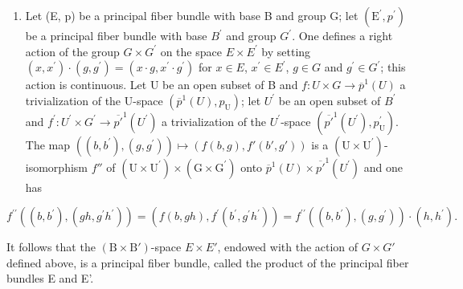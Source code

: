 \begin{enumerate}
\def\labelenumi{\arabic{enumi})}
\setcounter{enumi}{1}
\tightlist
\item
  Let (E, p) be a principal fiber bundle with base B and group G; let \((\mathrm{E}^{\prime}, p^{\prime})\) be a principal fiber bundle with base \(B^{\prime}\) and group \(G^{\prime}\). One defines a right action of the group \(G \times G^{\prime}\) on the space \(E \times E^{\prime}\) by setting \((x, x^{\prime}) \cdot (g, g^{\prime}) = (x \cdot g, x^{\prime} \cdot g^{\prime})\) for \(x \in E\), \(x^{\prime} \in E^{\prime}\), \(g \in G\) and \(g^{\prime} \in G^{\prime}\); this action is continuous. Let U be an open subset of B and \(f: U \times G \to \overline{p}^{1}(U)\) a trivialization of the U-space \((\overline{p}^{1}(U), p_{\mathrm{U}})\); let \(U^{\prime}\) be an open subset of \(B^{\prime}\) and \(f^{\prime}: U^{\prime} \times G^{\prime} \to \overline{p'}^{1}(U^{\prime})\) a trivialization of the \(U^{\prime}\)-space \((\overline{p'}^{1}(U^{\prime}), p_{\mathrm{U}}^{\prime})\). The map \(((b, b^{\prime}), (g, g^{\prime})) \mapsto (f(b, g), f'(b', g'))\) is a \((\mathrm{U} \times \mathrm{U}^{\prime})\)-isomorphism \(f''\) of \((\mathrm{U} \times \mathrm{U}^{\prime}) \times (\mathrm{G} \times \mathrm{G}^{\prime})\) onto \(\overline{p}^{1}(U) \times \overline{p'}^{1}(U^{\prime})\) and one has
\end{enumerate}

\[
f ^ {\prime \prime} ((b, b ^ {\prime}), (g h, g ^ {\prime} h ^ {\prime})) = (f (b, g h), f ^ {\prime} (b ^ {\prime}, g ^ {\prime} h ^ {\prime})) = f ^ {\prime \prime} ((b, b ^ {\prime}), (g, g ^ {\prime})) \cdot (h, h ^ {\prime}).
\]

It follows that the \((\mathrm{B} \times \mathrm{B}')\)-space \(E \times E'\), endowed with the action of \(G \times G'\) defined above, is a principal fiber bundle, called the product of the principal fiber bundles E and E'.

